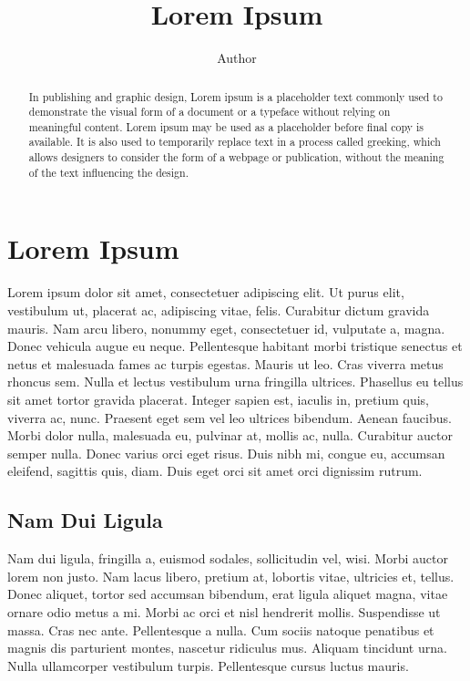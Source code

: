 \documentclass{article}
\title{Lorem Ipsum}
\author{Author}
\begin{document}
\maketitle

\begin{abstract}
In publishing and graphic design, Lorem ipsum is a placeholder text
commonly used to demonstrate the visual form of a document or a
typeface without relying on meaningful content. Lorem ipsum may be
used as a placeholder before final copy is available. It is also
used to temporarily replace text in a process called greeking,
which allows designers to consider the form of a webpage or
publication, without the meaning of the text influencing the
design.
\end{abstract}

\section{Lorem Ipsum}

Lorem ipsum dolor sit amet, consectetuer adipiscing elit. Ut purus elit,
vestibulum ut, placerat ac, adipiscing vitae, felis. Curabitur dictum gravida
mauris.
Nam arcu libero, nonummy eget, consectetuer id, vulputate a, magna. Donec
vehicula augue eu neque. Pellentesque habitant morbi tristique senectus et
netus et malesuada fames ac turpis egestas. Mauris ut leo. Cras viverra metus
rhoncus sem. Nulla et lectus vestibulum urna fringilla ultrices. Phasellus eu
tellus sit amet tortor gravida placerat. Integer sapien est, iaculis in,
pretium quis, viverra ac, nunc. Praesent eget sem vel leo ultrices bibendum.
Aenean faucibus. Morbi dolor nulla, malesuada eu, pulvinar at, mollis ac,
nulla. Curabitur auctor semper nulla. Donec varius orci eget risus. Duis nibh
mi, congue eu, accumsan eleifend, sagittis quis, diam. Duis eget orci sit amet
orci dignissim rutrum.

\subsection{Nam Dui Ligula}
Nam dui ligula, fringilla a, euismod sodales, sollicitudin vel, wisi. Morbi
auctor lorem non justo. Nam lacus libero, pretium at, lobortis vitae, ultricies
et, tellus. Donec aliquet, tortor sed accumsan bibendum, erat ligula aliquet
magna, vitae ornare odio metus a mi. Morbi ac orci et nisl hendrerit mollis.
Suspendisse ut massa. Cras nec ante. Pellentesque a nulla. Cum sociis natoque
penatibus et magnis dis parturient montes, nascetur ridiculus mus. Aliquam
tincidunt urna. Nulla ullamcorper vestibulum turpis. Pellentesque cursus luctus
mauris.
\end{document}
